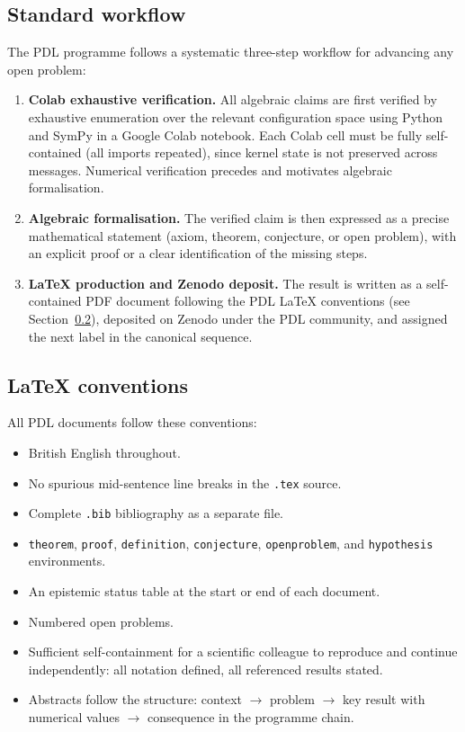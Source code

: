 \documentclass[11pt,a4paper]{article}
\theoremstyle{plain}
\theoremstyle{definition}
\theoremstyle{remark}
\begin{document}
\subsection{Standard workflow}
\label{subsec:workflow}

The PDL programme follows a systematic three-step workflow for advancing any open problem:
\begin{enumerate}
\item \textbf{Colab exhaustive verification.}
All algebraic claims are first verified by exhaustive enumeration over the relevant configuration space using Python and SymPy in a Google Colab notebook.
Each Colab cell must be fully self-contained (all imports repeated), since kernel state is not preserved across messages.
Numerical verification precedes and motivates algebraic formalisation.
\item \textbf{Algebraic formalisation.}
The verified claim is then expressed as a precise mathematical statement (axiom, theorem, conjecture, or open problem), with an explicit proof or a clear identification of the missing steps.
\item \textbf{LaTeX production and Zenodo deposit.}
The result is written as a self-contained PDF document following the PDL LaTeX conventions (see Section~\ref{subsec:latex}), deposited on Zenodo under the PDL community, and assigned the next label in the canonical sequence.
\end{enumerate}

\subsection{LaTeX conventions}
\label{subsec:latex}

All PDL documents follow these conventions:
\begin{itemize}
\item British English throughout.
\item No spurious mid-sentence line breaks in the \texttt{.tex} source.
\item Complete \texttt{.bib} bibliography as a separate file.
\item \texttt{theorem}, \texttt{proof}, \texttt{definition}, \texttt{conjecture}, \texttt{openproblem}, and \texttt{hypothesis} environments.
\item An epistemic status table at the start or end of each document.
\item Numbered open problems.
\item Sufficient self-containment for a scientific colleague to reproduce and continue independently: all notation defined, all referenced results stated.
\item Abstracts follow the structure: context $\to$ problem $\to$ key result with numerical values $\to$ consequence in the programme chain.
\end{itemize}
\end{document}
